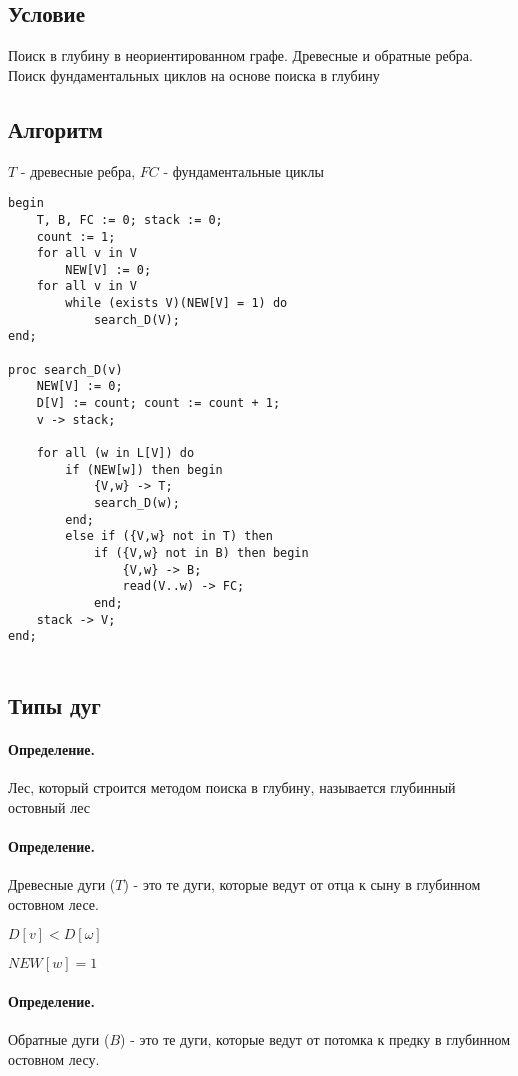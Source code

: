 \documentclass{report}
\begin{document}
\subsection{Условие}
Поиск в глубину в неориентированном графе. Древесные и обратные ребра. Поиск
фундаментальных циклов на основе поиска в глубину

\subsection{Алгоритм}

$T$ - древесные ребра,  $FC$ - фундаментальные  циклы

\begin{lstlisting}
begin
	T, B, FC := 0; stack := 0;
	count := 1;
	for all v in V
		NEW[V] := 0;
	for all v in V
		while (exists V)(NEW[V] = 1) do
			search_D(V);
end;

proc search_D(v)
	NEW[V] := 0;
	D[V] := count; count := count + 1;
	v -> stack;

	for all (w in L[V]) do
		if (NEW[w]) then begin
			{V,w} -> T;
			search_D(w);
		end;
		else if ({V,w} not in T) then
			if ({V,w} not in B) then begin
				{V,w} -> B;
				read(V..w) -> FC;
			end;
	stack -> V;
end;
		
\end{lstlisting}

\subsection{Типы дуг}

\paragraph*{Определение.}
Лес, который строится методом поиска в глубину, называется глубинный остовный лес

\paragraph*{Определение.}
Древесные дуги ($T$) - это те дуги, которые ведут от отца к сыну в глубинном остовном лесе.

$D[v] < D[\omega]$

$NEW[w] = 1$

\paragraph*{Определение.}
Обратные дуги ($B$) - это те дуги, которые ведут от потомка к предку в глубинном остовном лесу.
\end{document}
